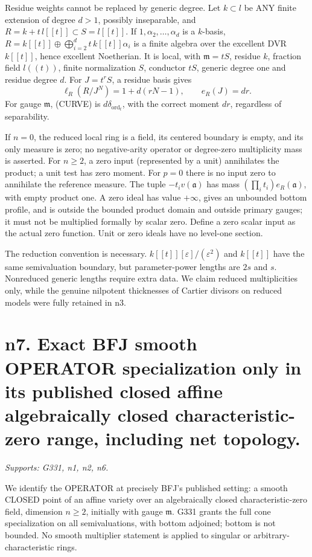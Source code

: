 \documentclass[11pt]{article}
\begin{document}
Residue weights cannot be replaced by generic degree. Let \(k\subset l\) be ANY finite extension of degree \(d>1\), possibly inseparable, and \(R=k+t\,l[[t]]\subset S=l[[t]]\). If \(1,\alpha_2,\ldots,\alpha_d\) is a \(k\)-basis, \(R=k[[t]]\oplus\bigoplus_{i=2}^d t\,k[[t]]\alpha_i\) is a finite algebra over the excellent DVR \(k[[t]]\), hence excellent Noetherian. It is local, with \(\mathfrak m=tS\), residue \(k\), fraction field \(l((t))\), finite normalization \(S\), conductor \(tS\), generic degree one and residue degree \(d\). For \(J=t^rS\), a residue basis gives
\[
\ell_R(R/J^N)=1+d(rN-1),\qquad e_R(J)=dr.
\]
For gauge \(\mathfrak m\), (CURVE) is \(d\delta_{\operatorname{ord}_t}\), with the correct moment \(dr\), regardless of separability.

If \(n=0\), the reduced local ring is a field, its centered boundary is empty, and its only measure is zero; no negative-arity operator or degree-zero multiplicity mass is asserted. For \(n\ge2\), a zero input (represented by a unit) annihilates the product; a unit test has zero moment. For \(p=0\) there is no input zero to annihilate the reference measure. The tuple \(-t_i v(\mathfrak a)\) has mass \((\prod_i t_i)e_R(\mathfrak a)\), with empty product one. A zero ideal has value \(+\infty\), gives an unbounded bottom profile, and is outside the bounded product domain and outside primary gauges; it must not be multiplied formally by scalar zero. Define a zero scalar input as the actual zero function. Unit or zero ideals have no level-one section.

The reduction convention is necessary. \(k[[t]][\varepsilon]/(\varepsilon^2)\) and \(k[[t]]\) have the same semivaluation boundary, but parameter-power lengths are \(2s\) and \(s\). Nonreduced generic lengths require extra data. We claim reduced multiplicities only, while the genuine nilpotent thicknesses of Cartier divisors on reduced models were fully retained in n3.

\section{n7. Exact BFJ smooth OPERATOR specialization only in its published closed affine algebraically closed characteristic-zero range, including net topology.}
\textit{Supports: G331, n1, n2, n6.}

We identify the OPERATOR at precisely BFJ's published setting: a smooth CLOSED point of an affine variety over an algebraically closed characteristic-zero field, dimension \(n\ge2\), initially with gauge \(\mathfrak m\). G331 grants the full cone specialization on all semivaluations, with bottom adjoined; bottom is not bounded. No smooth multiplier statement is applied to singular or arbitrary-characteristic rings.
\end{document}
